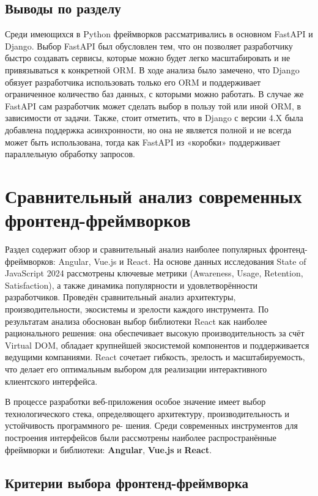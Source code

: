 \subsection{Выводы по разделу}
Среди имеющихся в Python фреймворков рассматривались в основном FastAPI
и Django. Выбор FastAPI был обусловлен тем, что он позволяет разработчику быстро создавать
сервисы, которые можно будет легко масштабировать и не привязываться к конкретной
ORM. В ходе анализа было замечено, что Django обязует разработчика использовать только
его ORM и поддерживает ограниченное количество баз данных, с которыми можно работать.
В случае же FastAPI сам разработчик может сделать выбор в пользу той или иной ORM, в
зависимости от задачи. Также, стоит отметить, что в Django с версии 4.X была добавлена
поддержка асинхронности, но она не является полной и не всегда может быть использована,
тогда как FastAPI из «коробки» поддерживает параллельную обработку запросов.
			

\section{Сравнительный анализ современных фронтенд-фреймворков}
\begin{annotation}
	Раздел содержит обзор и сравнительный анализ наиболее популярных фронтенд-
	фреймворков: Angular, Vue.js и React. На основе данных исследования State of JavaScript 2024
	рассмотрены ключевые метрики (Awareness, Usage, Retention, Satisfaction), а также динамика
	популярности и удовлетворённости разработчиков. Проведён сравнительный анализ
	архитектуры, производительности, экосистемы и зрелости каждого инструмента. По результатам
	анализа обоснован выбор библиотеки React как наиболее рационального решения: 
	она обеспечивает высокую производительность за счёт Virtual DOM, обладает крупнейшей 
	экосистемой компонентов и поддерживается ведущими компаниями. React сочетает 
	гибкость, зрелость и масштабируемость, что делает его оптимальным выбором для
	реализации интерактивного клиентского интерфейса.
\end{annotation}

В процессе разработки веб-приложения особое значение имеет выбор технологического
стека, определяющего архитектуру, производительность и устойчивость программного ре-
шения. Среди современных инструментов для построения интерфейсов были рассмотрены
наиболее распространённые фреймворки и библиотеки: \textbf{Angular}, \textbf{Vue.js} и \textbf{React}.

\subsection{Критерии выбора фронтенд-фреймворка}

